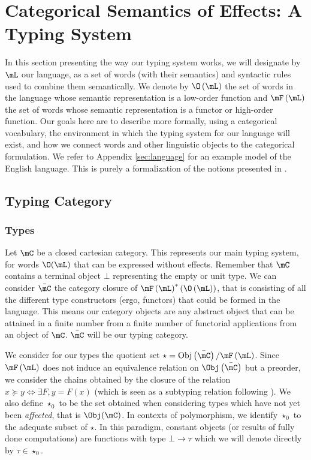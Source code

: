 \section{Categorical Semantics of Effects: A Typing System}
In this section presenting the way our typing system works, we will designate
by $\mL$ our language, as a set of words (with their semantics) and syntactic
rules used to combine them semantically.
We denote by $\O\left( \mL \right)$ the set of words in the language whose
semantic representation is a low-order function and $\mF\left( \mL \right)$ the
set of words whose semantic representation is a functor or high-order function.
Our goals here are to describe more formally, using a categorical vocabulary,
the environment in which the typing system for our language will exist, and how
we connect words and other linguistic objects to the categorical formulation.
We refer to Appendix \ref{sec:language} for an example model of the English
language.
This is purely a formalization of the notions presented in
\cite{bumfordEffectdrivenInterpretationFunctors2025}.

\subsection{Typing Category}
\subsubsection{Types}
Let $\mC$ be a closed cartesian category.
This represents our main typing system, for words $\O(\mL)$ that can be
expressed without effects.
Remember that $\mC$ contains a terminal object $\bot$ representing the empty or
unit type.
We can consider $\bar{\mC}$ the category closure of
$\mF\left( \mL \right)^{*}\left(\O\left( \mL \right)\right)$, that is
consisting of all the different type constructors (ergo, functors) that could
be formed in the language.
This means our category objects are any abstract object that
can be attained in a finite number from a finite number of functorial
applications from an object of $\mC$.
$\bar{\mC}$ will be our typing category.

We consider for our types the quotient set
$\star = \mathrm{Obj}\left( \bar{\mC} \right)/\mF\left( \mL \right)$.
Since $\mF\left( \mL \right)$ does not induce an equivalence relation on
$\Obj\left( \bar{\mC} \right)$ but a preorder, we consider the chains obtained
by the closure of the relation $x\succeq y \Leftrightarrow \exists F, y = F(x)$
(which is seen as a subtyping relation following
\cite{melliesFunctorsAreType2015}).
We also define $\star_{0}$ to be the set obtained when considering types which
have not yet been \emph{affected}, that is $\Obj(\mC)$.
In contexts of polymorphism, we identify $\star_{0}$ to the adequate subset of
$\star$.
In this paradigm, constant objects (or results of fully done computations) are
functions with type $\bot \to \tau$ which we will denote directly by
$\tau \in \star_{0}$.

